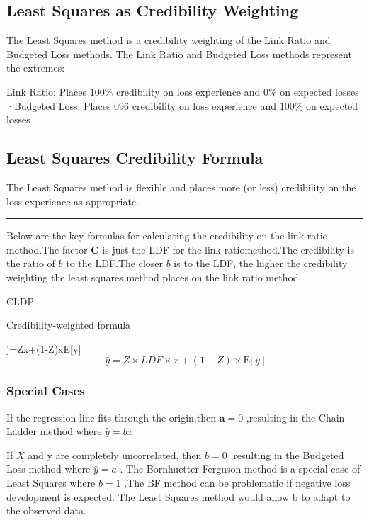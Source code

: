\documentclass[
]{article}
\begin{document}
\subsection{Least Squares as Credibility
Weighting}\label{least-squares-as-credibility-weighting}

The Least Squares method is a credibility weighting of the Link Ratio
and Budgeted Loss methods. The Link Ratio and Budgeted Loss methods
represent the extremes:

Link Ratio: Places \(100\%\) credibility on loss experience and \(0\%\)
on expected losses ·Budgeted Loss: Places 096 credibility on loss
experience and \(100\%\) on expected losses

\subsection{Least Squares Credibility
Formula}\label{least-squares-credibility-formula}

The Least Squares method is flexible and places more (or less)
credibility on the loss experience as appropriate.

\begin{center}\rule{0.5\linewidth}{0.5pt}\end{center}

Below are the key formulas for calculating the credibility on the link
ratio method.The factor \(\mathbf{C}\) is just the LDF for the link
ratiomethod.The credibility is the ratio of \(b\) to the LDF.The closer
\(b\) is to the LDF, the higher the credibility weighting the least
squares method places on the link ratio method

CLDP-\/---

Credibility-weighted formula

j=Zx+(1-Z)xE{[}y{]}
\[\hat{y}=Z\times LDF\times x+(1-Z)\times\mathrm{E}\Big[\:y\:\Big]\]

\subsubsection{Special Cases}\label{special-cases}

If the regression line fits through the origin,then \(\mathbf{a}=0\)
,resulting in the Chain Ladder method where \(\hat{y}=bx\)

If \(X\) and y are completely uncorrelated, then \(b=0\) ,resulting in
the Budgeted Loss method where \(\hat{y}=a\) . The Bornhuetter-Ferguson
method is a special case of Least Squares where \(b=1\) .The BF method
can be problematic if negative loss development is expected. The Least
Squares method would allow b to adapt to the observed data.
\end{document}
